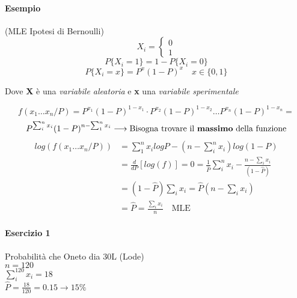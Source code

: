 \documentclass[]{article}
\begin{document}
    \paragraph{Esempio} (MLE Ipotesi di Bernoulli)
    \begin{equation*}
        X_i =
        \begin{cases}
            0 \\
            1
        \end{cases}
    \end{equation*}
    \[ P\{X_i = 1\} = 1 - P\{X_i = 0\} \]
    \[ P\{X_i = x\} = P^x (1-P)^x \quad x \in \{0, 1\} \]
    \centerline{Dove \textbf{X} è una \textit{variabile aleatoria} e \textbf{x} una \textit{variabile sperimentale} }
    \[ f(x_1 \ldots x_n / P) = P^{x_1} (1-P)^{1-x_1} \cdot P^{x_2} (1-P)^{1-x_2} \ldots P^{x_n} (1-P)^{1-x_n} = \]
    \[ P^{\sum_{i}^{n}x_i} (1-P)^{n - \sum_{1}^{n} x_i} \longrightarrow \text{Bisogna trovare il \textbf{massimo} della funzione} \]
    \begin{equation*}
        \begin{split}
            log(f(x_1 \ldots x_n / P)) &= \sum_{1}^{n} x_i log P - (n - \sum_{i}^{n} x_i) log(1-P) \\
            &= \frac{d}{dP}[log(f)] = 0 = \frac{1}{\hat{P}} \sum_{i}^{n} x_i - \frac{n - \sum_{i}^{} x_i }{(1-\hat{P})} \\
            &= (1- \hat{P}) \sum_{i}^{} x_i = \hat{P} (n - \sum_{i}^{} x_i) \\
            &= \hat{P} = \frac{\sum_{i}^{} x_i }{n} \quad \text{MLE}
        \end{split}
    \end{equation*}
    \paragraph{Esercizio 1} Probabilità che Oneto dia 30L (Lode) \\
    $n = 120$ \\
    $\sum_{i}^{120} x_i = 18$ \\
    $\hat{P} = \frac{18}{120} = 0.15 \rightarrow 15\%$ \\
\end{document}
